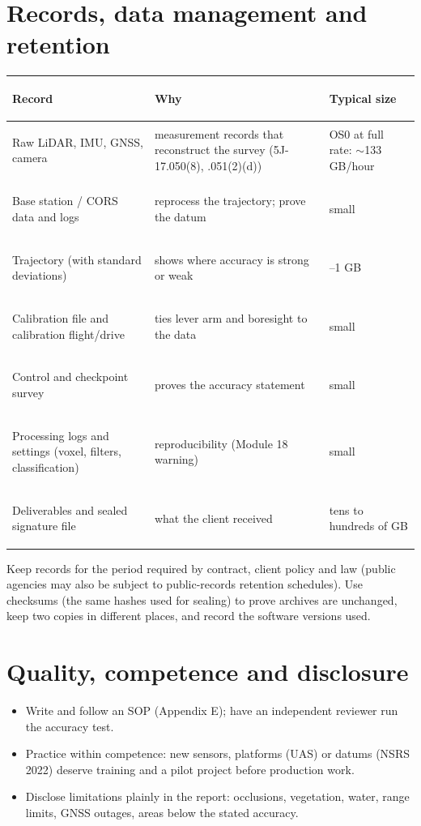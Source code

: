 \section{Records, data management and retention}\label{sec:records}
\begin{center}\small
\renewcommand{\arraystretch}{1.22}
\begin{tabularx}{\linewidth}{>{\bfseries\raggedright\arraybackslash}p{3.6cm}X>{\raggedright\arraybackslash}p{3.0cm}}\toprule
Record & Why & Typical size\\\midrule
Raw LiDAR, IMU, GNSS, camera & measurement records that reconstruct the survey (5J-17.050(8), .051(2)(d)) & OS0 at full rate: $\sim$133 GB/hour\\
Base station / CORS data and logs & reprocess the trajectory; prove the datum & small\\
Trajectory (with standard deviations) & shows where accuracy is strong or weak & 0.1--1 GB\\
Calibration file and calibration flight/drive & ties lever arm and boresight to the data & small\\
Control and checkpoint survey & proves the accuracy statement & small\\
Processing logs and settings (voxel, filters, classification) & reproducibility (Module 18 warning) & small\\
Deliverables and sealed signature file & what the client received & tens to hundreds of GB\\\bottomrule
\end{tabularx}\end{center}
Keep records for the period required by contract, client policy and law (public agencies may also be subject to public-records retention schedules). Use checksums (the same hashes used for sealing) to prove archives are unchanged, keep two copies in different places, and record the software versions used.

\section{Quality, competence and disclosure}
\begin{itemize}
\item Write and follow an SOP (Appendix E); have an independent reviewer run the accuracy test.
\item Practice within competence: new sensors, platforms (UAS) or datums (NSRS 2022) deserve training and a pilot project before production work.
\item Disclose limitations plainly in the report: occlusions, vegetation, water, range limits, GNSS outages, areas below the stated accuracy.
\end{itemize}


